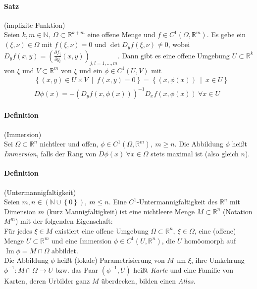 \documentclass[12pt,a4paper,fleqn]{article}
\DeclareMathOperator{\im}{Im}
\def\set#1{{\left\{ #1 \right\}}}
\def\Mid{\ \middle|\ }
\def\R{{\mathbb{R}}}
\begin{document}
\paragraph{Satz} (implizite Funktion)\\
Seien $k, m \in \mathbb{N},\ \Omega \subset \R^{k+m}$ eine offene Menge und $f \in C^1(\Omega, \R^m)$. Es gebe ein \mbox{$(\xi, \nu) \in \Omega$} mit $f(\xi, \nu) = 0$ und $\det D_yf(\xi, \nu) \not = 0$, wobei $D_yf(x, y) = \left(\frac{\partial f_j}{\partial y_l}(x, y)\right)_{j, l = 1, \dots, m}$. Dann gibt es eine offene Umgebung $U \subset \R^k$ von $\xi$ und $V \subset \R^m$ von $\xi$ und ein $\phi \in C^1(U, V)$ mit 
\begin{align*}
&\set{(x, y) \in U \times V \Mid f(x, y) = 0} = \set{(x, \phi(x)) \Mid x \in U}\\
&D\phi(x) = -(D_yf(x, \phi(x)))^{-1} D_xf(x, \phi(x))\ \forall x \in U
\end{align*}

\paragraph{Definition} (Immersion)\\
Sei $\Omega \subset \R^n$ nichtleer und offen, $\phi \in C^1(\Omega, \R^m),\ m \geq n$. Die Abbildung $\phi$ heißt \textit{Immersion}, falls der Rang von $D\phi(x)\ \forall x \in \Omega$ stets maximal ist (also gleich $n$).

\paragraph{Definition} (Untermannigfaltigkeit)\\
Seien $m, n \in (\mathbb{N} \cup \set{0}),\ m \leq n$. Eine $C^1$-Untermannigfaltigkeit des $\R^n$ mit Dimension $m$ (kurz Mannigfaltigkeit) ist eine nichtleere Menge $M \subset \R^n$ (Notation $M^m$) mit der folgenden Eigenschaft:\\
Für jedes $\xi \in M$ existiert eine offene Umgebung $\Omega \subset \R^n,\ \xi \in \Omega$, eine (offene) Menge $U \subset \R^m$ und eine Immersion $\phi \in C^1(U, \R^n)$, die $U$ homöomorph auf $\im \phi  = M \cap \Omega$ abbildet.\\
Die Abbildung $\phi$ heißt (lokale) Parametrisierung von $M$ um $\xi$, ihre Umkehrung $\phi^{-1}\colon M \cap \Omega \rightarrow U$ bzw. das Paar $(\phi^{-1}, U)$ heißt \textit{Karte} und eine Familie von Karten, deren Urbilder ganz $M$ überdecken, bilden einen \textit{Atlas}.
\end{document}
